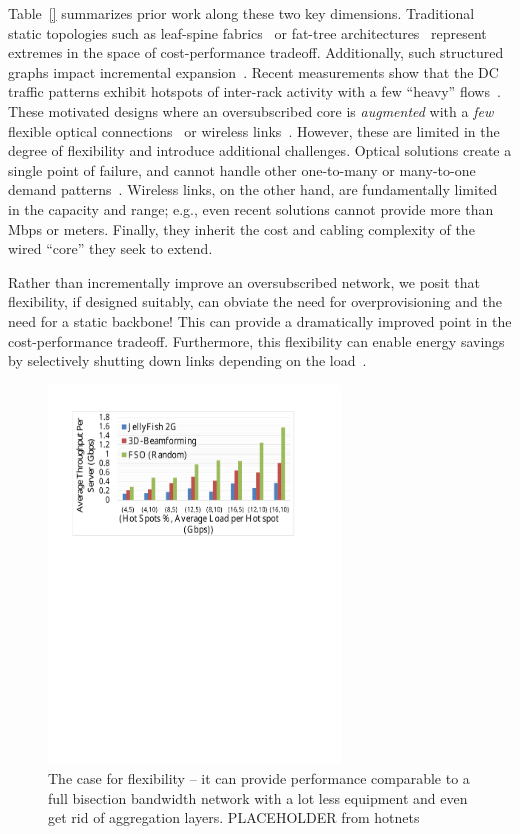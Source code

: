 Table~\ref{}  summarizes prior work along these two key dimensions.
Traditional  static topologies such as leaf-spine fabrics~\cite{}  or fat-tree
architectures~\cite{} represent extremes in the space of  cost-performance
tradeoff.   Additionally, such  structured graphs impact  incremental
expansion~\cite{jellyfish}.  Recent measurements show that the DC traffic
patterns  exhibit hotspots of inter-rack activity with  a few ``heavy''
flows~\cite{flyways,cthrough,vl2}.  These motivated  
 designs where an oversubscribed core is {\em augmented} with a {\em few} 
 flexible  optical connections~\cite{} or wireless links~\cite{}.
  However, these are limited in the degree of flexibility and introduce
  additional challenges.
  Optical solutions create  a single point of failure,  
  and  cannot handle other one-to-many or
many-to-one demand patterns~\cite{flyways}. Wireless links,
 on the other hand,  are fundamentally 
limited in the capacity and range; e.g., even recent solutions cannot 
 provide more than \plsfill Mbps or \plsfill meters. Finally, they inherit 
   the cost and cabling complexity of the wired ``core'' they seek to extend. 

 
Rather than incrementally improve  an oversubscribed network, we posit that
flexibility, if designed suitably, can obviate the need for overprovisioning
and the need for a static backbone! This can provide a dramatically improved
point in the cost-performance tradeoff.  Furthermore, this flexibility can
enable energy savings by selectively shutting down links depending  on the
load~\cite{elastictree,googleisca}. 

\begin{figure}
\includegraphics[width=220pt]{../hotnets13/Figures/Hotspots.pdf}
\caption{The case for flexibility -- it can provide performance comparable to a full bisection bandwidth 
 network with a lot less equipment and even get rid of aggregation layers. PLACEHOLDER from hotnets}
\label{fig:flexibility}
\end{figure}

